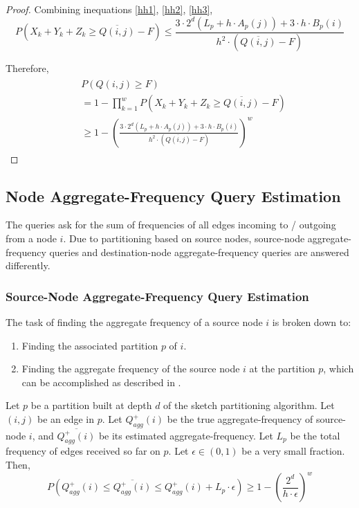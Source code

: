 \begin{proof}
Combining inequations \ref{hh1}, \ref{hh2}, \ref{hh3},
\begin{equation}
  P(X_k + Y_k + Z_k \geq \overline{Q(i,j)}-F) \leq \frac{3\cdot2^d(L_p+h\cdot A_p(j)) + 3\cdot h\cdot B_p(i)}{h^2\cdot (\overline{Q(i,j)}-F)}
\end{equation}

Therefore,
\begin{align}
\begin{split}
&  P(Q(i,j) \geq F)
\\  &= 1 - \prod _{k=1}^{w}P(X_k + Y_k + Z_k \geq \overline{Q(i,j)}-F)
\\  &\geq 1-(\frac{3\cdot2^d(L_p+h\cdot A_p(j)) + 3\cdot h\cdot B_p(i)}{h^2\cdot (\overline{Q(i,j)}-F)})^w
\end{split}
\end{align}

\end{proof}

\subsection{Node Aggregate-Frequency Query Estimation}

The queries ask for the sum of frequencies of all edges incoming to / outgoing from a node $i$. Due to partitioning based on source nodes, source-node aggregate-frequency queries and destination-node aggregate-frequency queries are answered differently.

\subsubsection{Source-Node Aggregate-Frequency Query Estimation}

The task of finding the aggregate frequency of a source node $i$ is broken down to:

\begin{enumerate}
\item Finding the associated partition $p$ of $i$.
\item Finding the aggregate frequency of the source node $i$ at the partition $p$, which can be accomplished as described in \cite{khan}.
\end{enumerate}


\begin{theorem}
\label{thm:agg1}
Let $p$ be a partition built at depth $d$ of the sketch partitioning algorithm. Let $(i,j)$ be an edge in $p$. Let $Q_{agg}^{+}(i)$ be the true aggregate-frequency of source-node $i$, and $\overline{Q_{agg}^{+}(i)}$ be its estimated aggregate-frequency. Let $L_p$ be the total frequency of edges received so far on $p$. Let $\epsilon \in (0,1)$ be a very small fraction. Then,
\[
P(Q_{agg}^{+}(i) \leq \overline{Q_{agg}^{+}(i)} \leq Q_{agg}^{+}(i) + L_p \cdot \epsilon) \geq 1-(\frac{2^d}{h\cdot\epsilon})^w
\]
\end{theorem}

